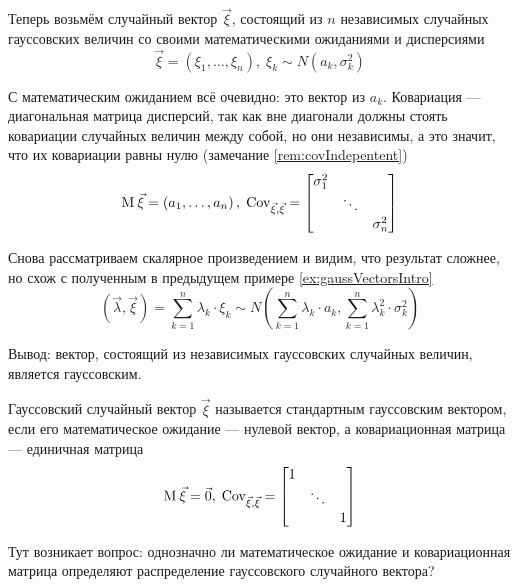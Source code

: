 \begin{example}\label{example:gaussianVector:gaussianElements}
  Теперь возьмём случайный вектор $\vec{\xi}$, состоящий из $n$ независимых
  случайных гауссовских величин со своими математическими ожиданиями
  и дисперсиями
  $$\vec{\xi} = \left( \xi_1, \dots, \xi_n \right),\;
      \xi_k \sim N\left( a_k, \sigma_k^2 \right)$$

  С математическим ожиданием всё очевидно: это вектор
  из $a_k$. Ковариация --- диагональная матрица дисперсий, так как вне
  диагонали должны стоять ковариации случайных величин между собой,
  но они независимы, а это значит, что их ковариации равны нулю
  (замечание \ref{rem:covIndepentent})
  $$\operatorname{M}_{} \vec{\xi} = \left( a_1, \dots, a_n \right),\;
      \operatorname{Cov}^{}_{\vec{\xi}, \vec{\xi}} =
      \begin{bmatrix}
      \sigma_1^2 & & \\
      & \ddots & \\
      & & \sigma_n^2
      \end{bmatrix}$$

  Снова рассматриваем скалярное произведением и видим, что результат сложнее,
  но схож с полученным в предыдущем примере \ref{ex:gaussVectorsIntro}
  $$\left( \vec{\lambda}, \vec{\xi} \right)
      = \sum_{k=1}^{n} \lambda_k \cdot \xi_k \sim
      N\left( \sum_{k=1}^{n} \lambda_k \cdot a_k,
      \sum_{k=1}^{n} \lambda_k^2 \cdot \sigma_k^2 \right)$$

  Вывод: вектор, состоящий из независимых гауссовских случайных величин,
  является гауссовским.
\end{example}

\begin{definition}
  Гауссовский случайный вектор $\vec{\xi}$ называется стандартным гауссовским
  вектором, если его математическое ожидание --- нулевой вектор,
  а ковариационная матрица --- единичная матрица
  $$\operatorname{M}_{} \vec{\xi} = \vec{0},\;
      \operatorname{Cov}^{}_{\vec{\xi}, \vec{\xi}} =
      \begin{bmatrix}
      1 & & \\
      & \ddots & \\
      & & 1
      \end{bmatrix}$$
\end{definition}

Тут возникает вопрос: однозначно ли математическое ожидание
и ковариационная матрица определяют распределение гауссовского случайного
вектора?

